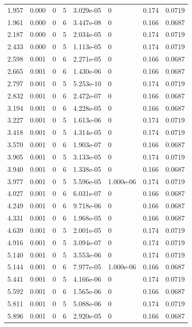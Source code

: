 \documentclass[preview]{standalone}
\begin{document}
{{\begin{tabular}{L{1.2cm}C{1.2cm} C{0.3cm}C{0.5cm} C{1.4cm}C{1.4cm} C{1.4cm}C{1.4cm}}
  1.957  &  0.000  & 0     &  5 &  3.029e-05  & 0  & 0.174 &  0.0719   \\ 
  1.961  &  0.000  & 0     &  6 &  3.447e-08  & 0  & 0.166 &  0.0687   \\ 
  2.187  &  0.000  & 0     &  5 &  2.034e-05  & 0  & 0.174 &  0.0719   \\ 
  2.433  &  0.000  & 0     &  5 &  1.113e-05  & 0  & 0.174 &  0.0719   \\ 
  2.598  &  0.001  & 0     &  6 &  2.271e-05  & 0  & 0.166 &  0.0687   \\ 
  2.665  &  0.001  & 0     &  6 &  1.430e-06  & 0  & 0.166 &  0.0687   \\ 
  2.797  &  0.001  & 0     &  5 &  5.253e-10  & 0  & 0.174 &  0.0719   \\ 
  2.832  &  0.001  & 0     &  6 &  2.472e-07  & 0  & 0.166 &  0.0687   \\ 
  3.194  &  0.001  & 0     &  6 &  4.228e-05  & 0  & 0.166 &  0.0687   \\ 
  3.227  &  0.001  & 0     &  5 &  1.613e-06  & 0  & 0.174 &  0.0719   \\ 
  3.418  &  0.001  & 0     &  5 &  4.314e-05  & 0  & 0.174 &  0.0719   \\ 
  3.570  &  0.001  & 0     &  6 &  1.903e-07  & 0  & 0.166 &  0.0687   \\ 
  3.905  &  0.001  & 0     &  5 &  3.133e-05  & 0  & 0.174 &  0.0719   \\ 
  3.940  &  0.001  & 0     &  6 &  1.338e-05  & 0  & 0.166 &  0.0687   \\ 
  3.977  &  0.001  & 0     &  5 &  5.596e-05  & 1.000e-06  & 0.174 &  0.0719   \\ 
  4.027  &  0.001  & 0     &  6 &  6.031e-07  & 0  & 0.166 &  0.0687   \\ 
  4.249  &  0.001  & 0     &  6 &  9.718e-06  & 0  & 0.166 &  0.0687   \\ 
  4.331  &  0.001  & 0     &  6 &  1.968e-05  & 0  & 0.166 &  0.0687   \\ 
  4.639  &  0.001  & 0     &  5 &  2.001e-05  & 0  & 0.174 &  0.0719   \\ 
  4.916  &  0.001  & 0     &  5 &  3.094e-07  & 0  & 0.174 &  0.0719   \\ 
  5.140  &  0.001  & 0     &  5 &  3.553e-06  & 0  & 0.174 &  0.0719   \\ 
  5.144  &  0.001  & 0     &  6 &  7.977e-05  & 1.000e-06  & 0.166 &  0.0687   \\ 
  5.441  &  0.001  & 0     &  5 &  4.166e-06  & 0  & 0.174 &  0.0719   \\ 
  5.592  &  0.001  & 0     &  6 &  1.565e-06  & 0  & 0.166 &  0.0687   \\ 
  5.811  &  0.001  & 0     &  5 &  5.088e-06  & 0  & 0.174 &  0.0719   \\ 
  5.896  &  0.001  & 0     &  6 &  2.920e-05  & 0  & 0.166 &  0.0687   \\ 
\hline 
\end{tabular} 

}}
\end{document}
